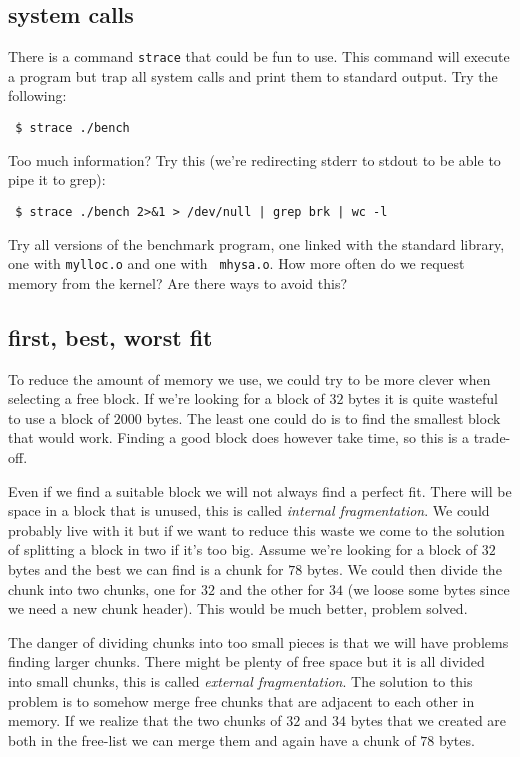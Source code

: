 \documentclass[a4paper,11pt]{article}
\begin{document}
\subsection{system calls}

There is a command {\tt strace} that could be fun to use. This command
will execute a program but trap all system calls and print them to
standard output. Try the following:

\begin{verbatim}
 $ strace ./bench
\end{verbatim}

Too much information? Try this (we're redirecting stderr to stdout to
be able to pipe it to grep):

\begin{verbatim}
 $ strace ./bench 2>&1 > /dev/null | grep brk | wc -l
\end{verbatim}

Try all versions of the benchmark program, one linked with the
standard library, one with {\tt mylloc.o} and one with {\tt
  mhysa.o}. How more often do we request memory from the kernel? Are
there ways to avoid this?

\subsection{first, best, worst fit}

To reduce the amount of memory we use, we could try to be more clever
when selecting a free block. If we're looking for a block of $32$
bytes it is quite wasteful to use a block of $2000$ bytes. The least
one could do is to find the smallest block that would work. Finding a
good block does however take time, so this is a trade-off.

Even if we find a suitable block we will not always find a perfect
fit. There will be space in a block that is unused, this is called
{\em internal fragmentation}. We could probably live with it but if we
want to reduce this waste we come to the solution of splitting a block
in two if it's too big. Assume we're looking for a block of $32$ bytes
and the best we can find is a chunk for $78$ bytes. We could then
divide the chunk into two chunks, one for $32$ and the other for $34$
(we loose some bytes since we need a new chunk header). This would be
much better, problem solved. 

The danger of dividing chunks into too small pieces is that we will
have problems finding larger chunks. There might be plenty of free
space but it is all divided into small chunks, this is called {\em
  external fragmentation}. The solution to this problem is to somehow
merge free chunks that are adjacent to each other in memory. If we
realize that the two chunks of $32$ and $34$ bytes that we created are
both in the free-list we can merge them and again have a chunk of $78$
bytes.
\end{document}
